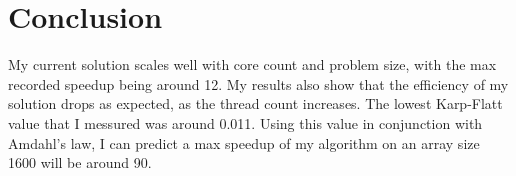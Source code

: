 \documentclass{report}
\begin{document}
\chapter{Conclusion}
My current solution scales well with core count and problem size, with the max recorded speedup being around 12. My results also show that the efficiency of my solution drops as expected, as the thread count increases. The lowest Karp-Flatt value that I messured was around 0.011. Using this value in conjunction with Amdahl's law, I can predict a max speedup of my algorithm on an array size 1600 will be around 90.
\end{document}
